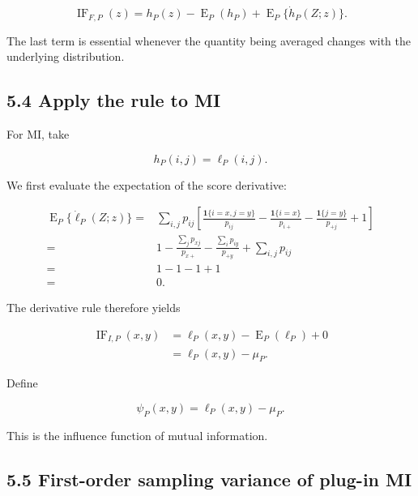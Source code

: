 \documentclass[
  11pt]{article}
\begin{document}
\begin{equation}
\boxed{
\operatorname{IF}_{F,P}(z)
=h_P(z)-\operatorname E_P(h_P)
+\operatorname E_P\{\dot h_P(Z;z)\}.
}
\end{equation}

The last term is essential whenever the quantity being averaged changes
with the underlying distribution.

\subsection{5.4 Apply the rule to MI}\label{apply-the-rule-to-mi}

For MI, take

\begin{equation}
h_P(i,j)=\ell_P(i,j).
\end{equation}

We first evaluate the expectation of the score derivative:

\begin{equation}
\begin{aligned}
\operatorname E_P\{\dot\ell_P(Z;z)\}
={}&\sum_{i,j}p_{ij}
\left[
\frac{\mathbf 1\{i=x,j=y\}}{p_{ij}}
-\frac{\mathbf 1\{i=x\}}{p_{i+}}
-\frac{\mathbf 1\{j=y\}}{p_{+j}}
+1
\right]\\
={}&1
-\frac{\sum_j p_{xj}}{p_{x+}}
-\frac{\sum_i p_{iy}}{p_{+y}}
+\sum_{i,j}p_{ij}\\
={}&1-1-1+1\\
={}&0.
\end{aligned}
\end{equation}

The derivative rule therefore yields

\begin{equation}
\begin{aligned}
\operatorname{IF}_{I,P}(x,y)
&=\ell_P(x,y)-\operatorname E_P(\ell_P)+0\\
&=\ell_P(x,y)-\mu_P.
\end{aligned}
\end{equation}

Define

\begin{equation}
\boxed{
\psi_P(x,y)=\ell_P(x,y)-\mu_P.
}
\end{equation}

This is the influence function of mutual information.

\subsection{5.5 First-order sampling variance of plug-in
MI}\label{first-order-sampling-variance-of-plug-in-mi}
\end{document}

